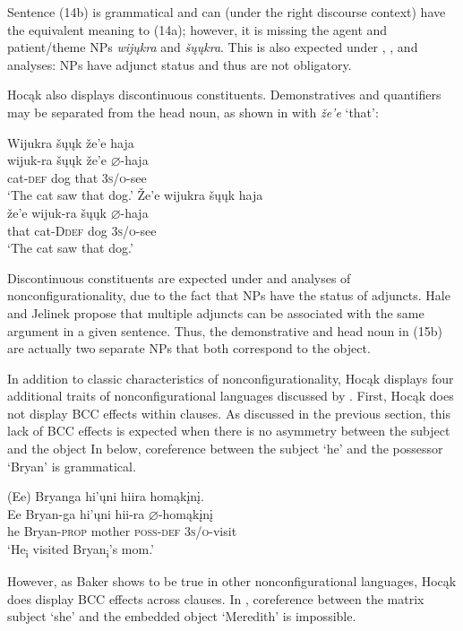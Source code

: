 \documentclass[output=paper]{LSP/langsci}
\begin{document}
Sentence (14b) is grammatical and can (under the right discourse context) have the equivalent meaning to (14a); however, it is missing the agent and patient/theme NPs \textit{wij\k{u}kra} and \textit{\v{s}\k{u}\k{u}kra}. This is also expected under , , and  analyses: NPs have adjunct status and thus are not obligatory.

Hocąk also displays discontinuous constituents. Demonstratives and quantifiers may be separated from the head noun, as shown in  with \textit{\v{z}e'e} `that': 

\begin{exe}
\ex\label{ex:jrs:15}
\begin{xlist} 
\glll Wijukra	\v{s}\k{u}\k{u}k	\v{z}e'e	haja \\
wijuk-ra	\v{s}\k{u}\k{u}k	\v{z}e'e	$\varnothing$-haja \\
	cat-\textsc{def} 	dog	that		\textsc{3s/o}-see\\
\trans `The cat saw that dog.' 
\glll \v{Z}e'e	wijukra	 \v{s}\k{u}\k{u}k	haja \\
\v{z}e'e	wijuk-ra	\v{s}\k{u}\k{u}k	$\varnothing$-haja \\
that cat-D\textsc{def} dog \textsc{3s/o}-see \\
\trans `The cat saw that dog.'
\end{xlist}
\end{exe}

Discontinuous constituents are expected under  and  analyses of nonconfigurationality, due to the fact that NPs have the status of adjuncts. Hale and Jelinek propose that multiple adjuncts can be associated with the same argument in a given sentence. Thus, the demonstrative and head noun in (15b) are actually two separate NPs that both correspond to the object.

In addition to  classic characteristics of nonconfigurationality, Hocąk displays four additional traits of nonconfigurational languages discussed by \citet{Baker1996}. First, Hocąk does not display BCC effects within clauses.  As discussed in the previous section, this lack of BCC effects is expected when there is no asymmetry between the subject and the object In  below, coreference between the subject `he' and the possessor `Bryan' is grammatical.

\begin{exe}
\ex\label{ex:jrs:16}	
\glll (Ee) 	Bryanga 			hi'\k{u}ni 	hiira 				homąk\k{i}n\k{i}. \\
Ee 		Bryan-ga 		hi'\k{u}ni 	hii-ra 			$\varnothing$-homąk\k{i}n\k{i} \\
he 		Bryan-\textsc{prop} mother 	\textsc{poss-def} 	\textsc{3s/o}-visit  \\
\trans `He\textsubscript{i} visited Bryan\textsubscript{i}'s mom.'
\end{exe}
However, as Baker shows to be true in other nonconfigurational languages, Hocąk does display BCC effects across clauses. In , coreference between the matrix subject `she' and the embedded object `Meredith' is impossible.
\end{document}
